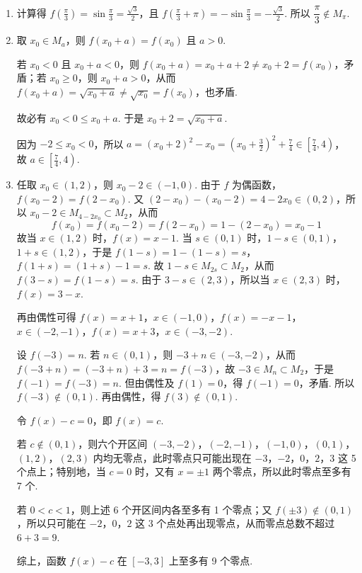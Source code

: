\begin{solution}
\begin{enumerate}
\item 计算得 \(f\left(\frac{\pi}{3}\right)=\sin\frac{\pi}{3}=\frac{\sqrt{3}}{2}\)，且 \(f\left(\frac{\pi}{3}+\pi\right)=-\sin\frac{\pi}{3}=-\frac{\sqrt{3}}{2}\). 所以 \(\dfrac{\pi}{3}\notin M_{\pi}\).

\item 取 \(x_0\in M_a\)，则 \(f(x_0+a)=f(x_0)\) 且 \(a>0\).

若 \(x_0<0\) 且 \(x_0+a<0\)，则 \(f(x_0+a)=x_0+a+2\ne x_0+2=f(x_0)\)，矛盾；若 \(x_0\ge0\)，则 \(x_0+a>0\)，从而 \(f(x_0+a)=\sqrt{x_0+a}\ne\sqrt{x_0}=f(x_0)\)，也矛盾.

故必有 \(x_0<0\le x_0+a\). 于是 \(x_0+2=\sqrt{x_0+a}\).

因为 \(-2\le x_0<0\)，所以
\(
a=(x_0+2)^2-x_0=\left(x_0+\frac{3}{2}\right)^2+\frac{7}{4}\in\left[\frac{7}{4},4\right)
\)，
故 \(a\in\left[\frac{7}{4},4\right)\).

\item 任取 \(x_0\in(1,2)\)，则 \(x_0-2\in(-1,0)\). 由于 \(f\) 为偶函数，\(f(x_0-2)=f(2-x_0)\). 又 \((2-x_0)-(x_0-2)=4-2x_0\in(0,2)\)，所以 \(x_0-2\in M_{4-2x_0}\subset M_2\)，从而
\[
f(x_0)=f(x_0-2)=f(2-x_0)=1-(2-x_0)=x_0-1
\]
故当 \(x\in(1,2)\) 时，\(f(x)=x-1\).
当 \(s\in(0,1)\) 时，\(1-s\in(0,1)\)，\(1+s\in(1,2)\)，于是 \(f(1-s)=1-(1-s)=s\)，\(f(1+s)=(1+s)-1=s\). 故 \(1-s\in M_{2s}\subset M_2\)，从而 \(f(3-s)=f(1-s)=s\). 由于 \(3-s\in(2,3)\)，所以当 \(x\in(2,3)\) 时，\(f(x)=3-x\).

再由偶性可得
\(f(x)=x+1\)，\(x\in(-1,0)\)，\(f(x)=-x-1\)，\(x\in(-2,-1)\)，\(f(x)=x+3\)，\(x\in(-3,-2)\).

设 \(f(-3)=n\). 若 \(n\in(0,1)\)，则 \(-3+n\in(-3,-2)\)，从而 \(f(-3+n)=(-3+n)+3=n=f(-3)\)，故 \(-3\in M_n\subset M_2\)，于是 \(f(-1)=f(-3)=n\).
但由偶性及 \(f(1)=0\)，得 \(f(-1)=0\)，矛盾. 所以 \(f(-3)\notin(0,1)\). 再由偶性，得 \(f(3)\notin(0,1)\).

令 \(f(x)-c=0\)，即 \(f(x)=c\).

若 \(c\notin(0,1)\)，则六个开区间
\((-3,-2)\)，\((-2,-1)\)，\((-1,0)\)，\((0,1)\)，\((1,2)\)，\((2,3)\)
内均无零点，此时零点只可能出现在 \(-3\)，\(-2\)，\(0\)，\(2\)，\(3\) 这 5 个点上；特别地，当 \(c=0\) 时，又有 \(x=\pm1\) 两个零点，所以此时零点至多有 7 个.

若 \(0<c<1\)，则上述 6 个开区间内各至多有 1 个零点；又 \(f(\pm3)\notin(0,1)\)，所以只可能在 \(-2\)，\(0\)，\(2\) 这 3 个点处再出现零点，从而零点总数不超过 \(6+3=9\).

综上，函数 \(f(x)-c\) 在 \([-3,3]\) 上至多有 9 个零点.
\end{enumerate}
\end{solution}

